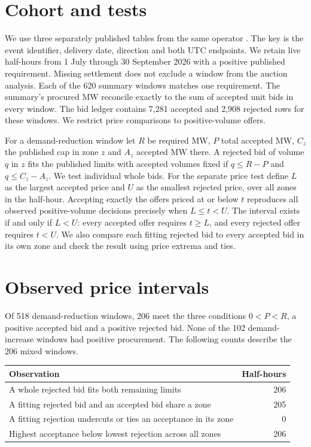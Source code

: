 \documentclass[11pt]{article}
\begin{document}
\section{Cohort and tests}
We use three separately published tables from the same operator \cite{data}. The key is the event identifier, delivery date, direction and both UTC endpoints. We retain live half-hours from 1 July through 30 September 2026 with a positive published requirement. Missing settlement does not exclude a window from the auction analysis. Each of the 620 summary windows matches one requirement. The summary's procured MW reconcile exactly to the sum of accepted unit bids in every window. The bid ledger contains 7,281 accepted and 2,908 rejected rows for these windows. We restrict price comparisons to positive-volume offers.

For a demand-reduction window let $R$ be required MW, $P$ total accepted MW, $C_z$ the published cap in zone $z$ and $A_z$ accepted MW there. A rejected bid of volume $q$ in $z$ fits the published limits with accepted volumes fixed if $q\leq R-P$ and $q\leq C_z-A_z$. We test individual whole bids. For the separate price test define $L$ as the largest accepted price and $U$ as the smallest rejected price, over all zones in the half-hour. Accepting exactly the offers priced at or below $t$ reproduces all observed positive-volume decisions precisely when $L\leq t<U$. The interval exists if and only if $L<U$: every accepted offer requires $t\geq L$, and every rejected offer requires $t<U$. We also compare each fitting rejected bid to every accepted bid in its own zone and check the result using price extrema and ties.

\section{Observed price intervals}
Of 518 demand-reduction windows, 206 meet the three conditions $0<P<R$, a positive accepted bid and a positive rejected bid. None of the 102 demand-increase windows had positive procurement. The following counts describe the 206 mixed windows.

\begin{center}
\begin{tabular}{@{}lr@{}}
\toprule
Observation & Half-hours\\
\midrule
A whole rejected bid fits both remaining limits & 206\\
A fitting rejected bid and an accepted bid share a zone & 205\\
A fitting rejection undercuts or ties an acceptance in its zone & 0\\
Highest acceptance below lowest rejection across all zones & 206\\
\bottomrule
\end{tabular}
\end{center}
\end{document}
